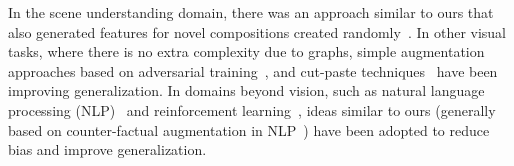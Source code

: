 In the scene understanding domain, there was an approach similar to ours that also generated features for novel compositions created randomly~\citep{wang2019generating}.
In other visual tasks, where there is no extra complexity due to graphs, simple augmentation approaches based on adversarial training~\citep{shetty2020towards}, and cut-paste techniques~\citep{dwibedi2017cut,dvornik2018modeling,tripathi2019learning,ghiasi2021simple} have been improving generalization.
In domains beyond vision, such as natural language processing (NLP)~\citep{joshi2021investigation} and reinforcement learning~\citep{hill2019environmental}, ideas similar to ours (generally based on counter-factual augmentation in NLP~\citep{kaushik2019learning}) have been adopted to reduce bias and improve generalization.